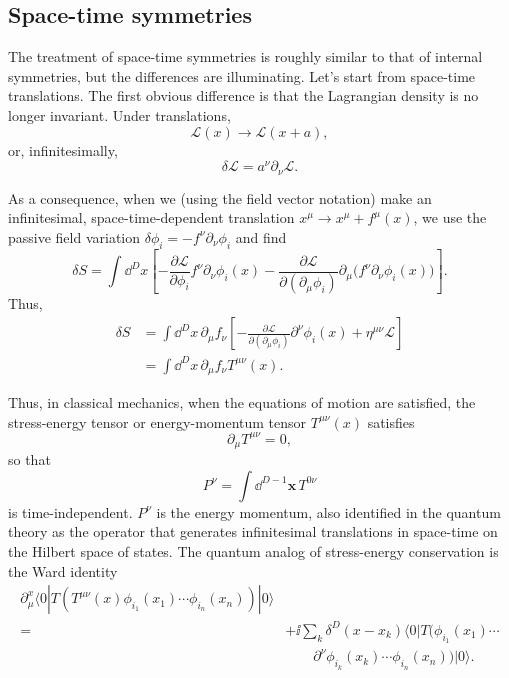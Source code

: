 \subsection{Space-time symmetries}

The treatment of space-time symmetries is roughly similar to that of internal
symmetries, but the differences are illuminating. Let's start from space-time
translations. The first obvious difference is that the Lagrangian density is no
longer invariant. Under translations,
\begin{equation*}
  \mathcal L(x)\longrightarrow\mathcal L(x+a),
\end{equation*}
or, infinitesimally,
\begin{equation*}
  \delta\mathcal L=a^\nu\partial_\nu\mathcal L.
\end{equation*}

As a consequence, when we (using the field vector notation) make an
infinitesimal, space-time-dependent translation $x^\mu\to x^\mu+f^\mu(x)$,
we use the passive field variation
$\delta\phi_i=-f^\nu\partial_\nu\phi_i$ and find
\begin{equation*}
  \delta S=\int\dd^D x\left[
  -\frac{\partial\mathcal L}{\partial\phi_i}f^\nu\partial_\nu\phi_i(x)
  -\frac{\partial\mathcal L}{\partial(\partial_\mu\phi_i)}
  \partial_\mu\bigl(f^\nu\partial_\nu\phi_i(x)\bigr)\right].
\end{equation*}
Thus,
\begin{align*}
  \delta S
  &=\int\dd^D x\,\partial_\mu f_\nu
  \left[-\frac{\partial\mathcal L}{\partial(\partial_\mu\phi_i)}
  \partial^\nu\phi_i(x)+\eta^{\mu\nu}\mathcal L\right]\\
  &=\int\dd^D x\,\partial_\mu f_\nu T^{\mu\nu}(x).
\end{align*}

Thus, in classical mechanics, when the equations of motion are satisfied, the
stress-energy tensor or energy-momentum tensor $T^{\mu\nu}(x)$ satisfies
\begin{equation*}
  \partial_\mu T^{\mu\nu}=0,
\end{equation*}
so that
\begin{equation*}
  P^\nu=\int\dd^{D-1}\mathbf x\,T^{0\nu}
\end{equation*}
is time-independent. $P^\nu$ is the energy momentum, also identified in the
quantum theory as the operator that generates infinitesimal translations in
space-time on the Hilbert space of states. The quantum analog of stress-energy
conservation is the Ward identity
\begin{equation*}
\begin{aligned}
\partial^x_\mu\langle0|T(T^{\mu\nu}(x)\phi_{i_1}(x_1)\cdots
\phi_{i_n}(x_n))|0\rangle\\
={}&+\ii\sum_k\delta^D(x-x_k)\langle0|T(\phi_{i_1}(x_1)\cdots\\
&\qquad\partial^\nu\phi_{i_k}(x_k)\cdots\phi_{i_n}(x_n))|0\rangle.
\end{aligned}
\end{equation*}

